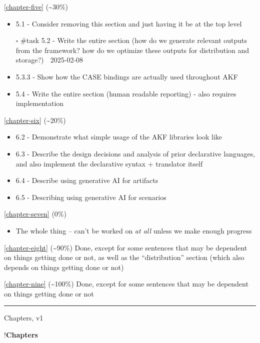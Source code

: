 \autoref{chapter-five} (\textasciitilde30\%)

\begin{itemize}
\tightlist
\item
  5.1 - Consider removing this section and just having it be at the top
  level
\item[$\square$]
  \#task 5.2 - Write the entire section (how do we generate relevant
  outputs from the framework? how do we optimize these outputs for
  distribution and storage?) 📅 2025-02-08
\item
  5.3.3 - Show how the CASE bindings are actually used throughout AKF
\item
  5.4 - Write the entire section (human readable reporting) - also
  requires implementation
\end{itemize}

\autoref{chapter-six} (\textasciitilde20\%)

\begin{itemize}
\tightlist
\item
  6.2 - Demonstrate what simple usage of the AKF libraries look like
\item
  6.3 - Describe the design decisions and analysis of prior declarative
  languages, and also implement the declarative syntax + translator
  itself
\item
  6.4 - Describe using generative AI for artifacts
\item
  6.5 - Describing using generative AI for scenarios
\end{itemize}

\autoref{chapter-seven} (0\%)

\begin{itemize}
\tightlist
\item
  The whole thing -- can't be worked on \emph{at all} unless we make
  enough progress
\end{itemize}

\autoref{chapter-eight} (\textasciitilde90\%) Done, except for some
sentences that may be dependent on things getting done or not, as well
as the ``distribution'' section (which also depends on things getting
done or not)

\autoref{chapter-nine} (\textasciitilde100\%) Done, except for some
sentences that may be dependent on things getting done or not

\begin{center}\rule{0.5\linewidth}{0.5pt}\end{center}

Chapters, v1

!\textbf{Chapters}
